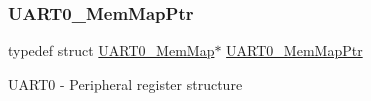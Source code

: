 \subsubsection{\texorpdfstring{U\+A\+R\+T0\+\_\+\+Mem\+Map\+Ptr}{UART0\_MemMapPtr}}
{\footnotesize\ttfamily typedef struct \hyperlink{struct_u_a_r_t0___mem_map}{U\+A\+R\+T0\+\_\+\+Mem\+Map}$\ast$ \hyperlink{group___u_a_r_t0___peripheral_gae795171499e041fb9b8f6ad5b97f896b}{U\+A\+R\+T0\+\_\+\+Mem\+Map\+Ptr}}

U\+A\+R\+T0 -\/ Peripheral register structure 